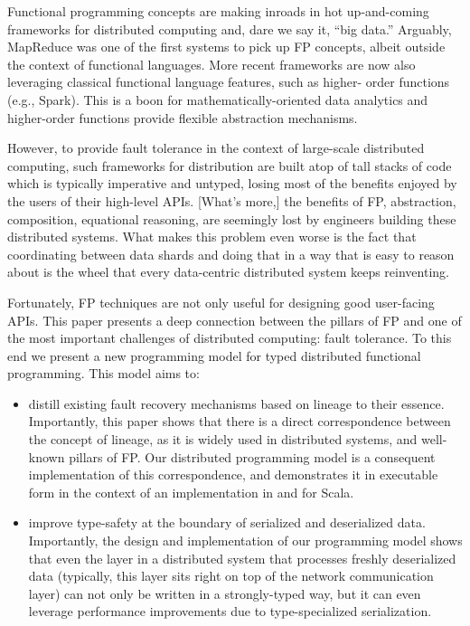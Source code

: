 \documentclass{sigplanconf}
\theoremstyle{definition}
\theoremstyle{definition}
\begin{document}
Functional programming concepts are making inroads in hot up-and-coming
frameworks for distributed computing and, dare we say it, ``big data.''
Arguably, MapReduce was one of the first systems to pick up FP concepts,
albeit outside the context of functional languages. More recent frameworks are
now also leveraging classical functional language features, such as higher-
order functions (e.g., Spark). This is a boon for mathematically-oriented data
analytics and higher-order functions provide flexible abstraction mechanisms.

However, to provide fault tolerance in the context of large-scale distributed
computing, such frameworks for distribution are built atop of tall stacks of
code which is typically imperative and untyped, losing most of the benefits
enjoyed by the users of their high-level APIs. [What's more,] the benefits of
FP, abstraction, composition, equational reasoning, are seemingly lost by
engineers building these distributed systems. What makes this problem even
worse is the fact that coordinating between data shards and doing that in a
way that is easy to reason about is the wheel that every data-centric
distributed system keeps reinventing.

Fortunately, FP techniques are not only useful for designing good user-facing
APIs. This paper presents a deep connection between the pillars of FP and one
of the most important challenges of distributed computing: fault tolerance. To
this end we present a new programming model for typed distributed functional
programming. This model aims to:

\begin{itemize}
\item distill existing fault recovery mechanisms based on lineage to their essence.
Importantly, this paper shows that there is a direct correspondence between
the concept of lineage, as it is widely used in distributed systems, and well-known
pillars of FP. Our distributed programming model is a consequent
implementation of this correspondence, and demonstrates it in executable form
in the context of an implementation in and for Scala.

\item improve type-safety at the boundary of serialized and deserialized data.
Importantly, the design and implementation of our programming model shows that
even the layer in a distributed system that processes freshly deserialized
data (typically, this layer sits right on top of the network communication
layer) can not only be written in a strongly-typed way, but it can even
leverage performance improvements due to type-specialized serialization.
\end{itemize}
\end{document}
